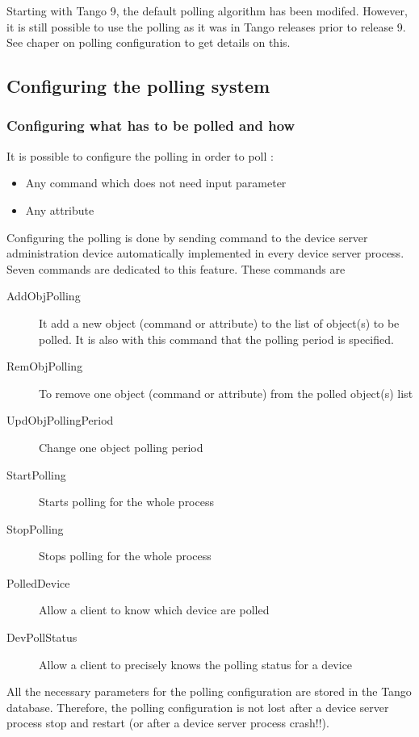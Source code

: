 Starting with Tango 9, the default polling algorithm has been modifed.
However, it is still possible to use the polling as it was in Tango
releases prior to release 9. See chaper on polling configuration to
get details on this.

\subsection{Configuring the polling system}

\subsubsection{Configuring what has to be polled and how}

It is possible to configure the polling in order to poll :
\begin{itemize}
\item Any command which does not need input parameter
\item Any attribute
\end{itemize}
Configuring the polling is done by sending command to the device server
administration device automatically implemented in every device server
process. Seven commands are dedicated to this feature. These commands
are
\begin{description}
\item [{AddObjPolling}] It add a new object (command
or attribute) to the list of object(s) to be polled. It is also with
this command that the polling period is specified.
\item [{RemObjPolling}] To remove one object (command
or attribute) from the polled object(s) list
\item [{UpdObjPollingPeriod}] Change one object
polling period
\item [{StartPolling}] Starts polling for the whole
process
\item [{StopPolling}] Stops polling for the whole process
\item [{PolledDevice}] Allow a client to know which
device are polled
\item [{DevPollStatus}] Allow a client to precisely
knows the polling status for a device
\end{description}
All the necessary parameters for the polling configuration are stored
in the Tango database. Therefore, the polling configuration is not
lost after a device server process stop and restart (or after a device
server process crash!!).

